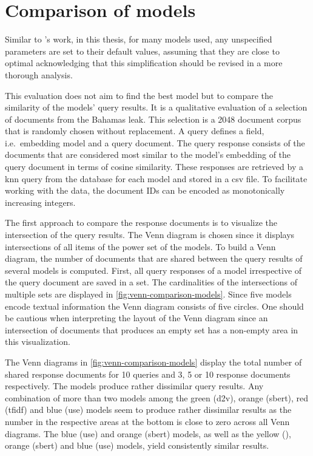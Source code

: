 \section{Comparison of models}\label{sec:evaluation-models}

Similar to \citeauthor{glove2014}'s work, in this thesis, for many models used, any unspecified parameters are set to their default values, 
assuming that they are close to optimal
acknowledging that this simplification should be revised in a more thorough analysis.

This evaluation does not aim to find the best model but to compare the similarity of the models' query results.
It is a qualitative evaluation of a selection of documents from the Bahamas leak.
This selection is a 2048 document corpus that is randomly chosen without replacement.
A query defines a field, i.e.\ embedding model and a query document.
The query response consists of the documents that are considered most similar to the model's embedding of the query document in terms of cosine similarity.
These responses are retrieved by a \ac{knn} query from the database for each model and stored in a \ac{csv} file.
To facilitate working with the data, the document IDs can be encoded as monotonically increasing integers.

The first approach to compare the response documents is to visualize the intersection of the query results.
The Venn diagram is chosen since it displays intersections of all items of the power set of the models.
To build a Venn diagram, the number of documents that are shared between the query results of several models is computed.
First, all query responses of a model irrespective of the query document are saved in a set.
The cardinalities of the intersections of multiple sets are displayed in \autoref{fig:venn-comparison-models}.
Since five models encode textual information the Venn diagram consists of five circles.
One should be cautious when interpreting the layout of the Venn diagram since 
an intersection of documents that produces an empty set has a non-empty area in this visualization.

The Venn diagrams in \autoref{fig:venn-comparison-models} display the total number of shared response documents for 10 queries 
and 3, 5 or 10 response documents respectively.
The models produce rather dissimilar query results.
Any combination of more than two models among the green (\ac{d2v}), orange (\ac{sbert}), red (\ac{tfidf}) and blue (\ac{use}) models 
seem to produce rather dissimilar results 
as the number in the respective areas at the bottom is close to zero across all Venn diagrams.
The blue (\ac{use}) and orange (\ac{sbert}) models, as well as the yellow (\infersent{}), orange (\ac{sbert}) and blue (\ac{use}) models, 
yield consistently similar results.

